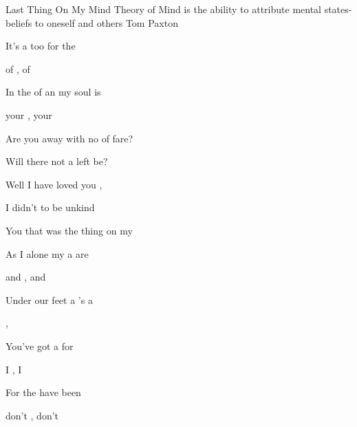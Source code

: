 \begin{SBSong}{Last Thing On My Mind}
  {Theory of Mind is the ability to attribute mental states-beliefs to oneself and others}
  {Tom Paxton}
  \begin{SBVerse}
	It's a  too  for the 
	
	 of ,  of 
	
	In the  of an  my soul is 
	
	 your ,  your 
  \end{SBVerse}
  \begin{SBChorus}
	Are you  away with no  of fare?
	
	Will there  not a  left be?
	
	Well I  have loved you ,
	
	I didn't  to be unkind
	
	You  that was the  thing on my 
  \end{SBChorus}
  \begin{SBVerse}    
	As I  alone my  a are 
	
	 and ,  and  
	
	Under our feet a 's a 
	
	, 
  \end{SBVerse}  
  \begin{SBVerse}
	You've got  a  for 
	
	 I ,  I 
	
	For the  have been  
	
	 don't ,  don't 
  \end{SBVerse}
\end{SBSong}
